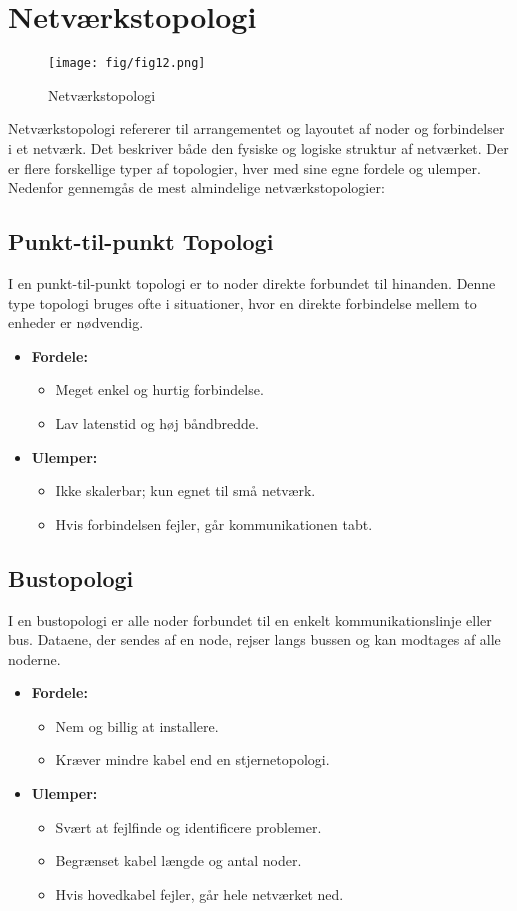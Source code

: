 \chapter{Netværkstopologi}
\begin{figure}[!h]
	\centering
	\texttt{[image: fig/fig12.png]}
	\caption{Netværkstopologi}
\end{figure}
\noindent Netværkstopologi refererer til arrangementet og layoutet af noder og forbindelser i et netværk. Det beskriver både den fysiske og logiske struktur af netværket. Der er flere forskellige typer af topologier, hver med sine egne fordele og ulemper. Nedenfor gennemgås de mest almindelige netværkstopologier:

\section{Punkt-til-punkt Topologi}
I en punkt-til-punkt topologi er to noder direkte forbundet til hinanden. Denne type topologi bruges ofte i situationer, hvor en direkte forbindelse mellem to enheder er nødvendig.
\begin{itemize}
	\item \textbf{Fordele:}
	\begin{itemize}
		\item Meget enkel og hurtig forbindelse.
		\item Lav latenstid og høj båndbredde.
	\end{itemize}
	\item \textbf{Ulemper:}
	\begin{itemize}
		\item Ikke skalerbar; kun egnet til små netværk.
		\item Hvis forbindelsen fejler, går kommunikationen tabt.
	\end{itemize}
\end{itemize}

\section{Bustopologi}
I en bustopologi er alle noder forbundet til en enkelt kommunikationslinje eller bus. Dataene, der sendes af en node, rejser langs bussen og kan modtages af alle noderne.
\begin{itemize}
	\item \textbf{Fordele:}
	\begin{itemize}
		\item Nem og billig at installere.
		\item Kræver mindre kabel end en stjernetopologi.
	\end{itemize}
	\item \textbf{Ulemper:}
	\begin{itemize}
		\item Svært at fejlfinde og identificere problemer.
		\item Begrænset kabel længde og antal noder.
		\item Hvis hovedkabel fejler, går hele netværket ned.
	\end{itemize}
\end{itemize}

